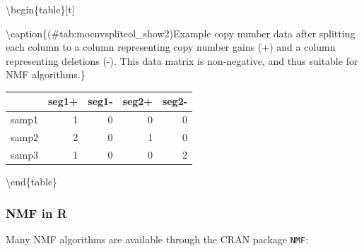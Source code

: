 \documentclass[12pt,]{krantz}
\begin{document}
\textbackslash{}begin\{table\}{[}t{]}

\textbackslash{}caption\{(\#tab:mocnvsplitcol\_show2)Example copy number data after splitting each column to a column representing copy number gains (+) and a column representing deletions (-). This data matrix is non-negative, and thus suitable for NMF algorithms.\}
\centering

\begin{tabular}{l|r|r|r|r}
\hline
  & seg1+ & seg1- & seg2+ & seg2-\\
\hline
samp1 & 1 & 0 & 0 & 0\\
\hline
samp2 & 2 & 0 & 1 & 0\\
\hline
samp3 & 1 & 0 & 0 & 2\\
\hline
\end{tabular}

\textbackslash{}end\{table\}

\hypertarget{nmf-in-r}{%
\subsubsection{NMF in R}\label{nmf-in-r}}

Many NMF algorithms are available through the CRAN package \texttt{NMF}:
\end{document}
